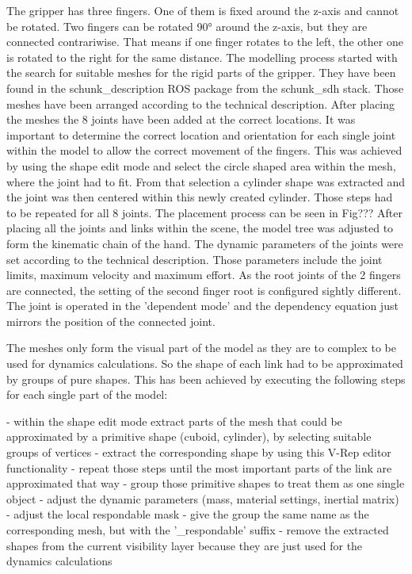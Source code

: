 The gripper has three fingers. One of them is fixed around the z-axis and cannot be rotated. Two fingers can be rotated 90° around the z-axis, but they are connected contrariwise. That means if one finger rotates to the left, the other one is rotated to the right for the same distance.
The modelling process started with the search for suitable meshes for the rigid parts of the gripper. They have been found in the schunk\_description ROS package from the schunk\_sdh stack. Those meshes have been arranged according to the technical description. After placing the meshes the 8 joints have been added at the correct locations. It was important to determine the correct location and orientation for each single joint within the model to allow the correct movement of the fingers. This was achieved by using the shape edit mode and select the circle shaped area within the mesh, where the joint had to fit. From that selection a cylinder shape was extracted and the joint was then centered within this newly created cylinder. Those steps had to be repeated for all 8 joints. The placement process can be seen in Fig??? After placing all the joints and links within the scene, the model tree was adjusted to form the kinematic chain of the hand. The dynamic parameters of the joints were set according to the technical description. Those parameters include the joint limits, maximum velocity and maximum effort. As the root joints of the 2 fingers are connected, the setting of the second finger root is configured sightly different. The joint is operated in the 'dependent mode' and the dependency equation just mirrors the position of the connected joint.

The meshes only form the visual part of the model as they are to complex to be used for dynamics calculations. So the shape of each link had to be approximated by groups of pure shapes. This has been achieved by executing the following steps for each single part of the model:

- within the shape edit mode extract parts of the mesh that could be approximated by a primitive
  shape (cuboid, cylinder), by selecting suitable groups of vertices
- extract the corresponding shape by using this V-Rep editor functionality
- repeat those steps until the most important parts of the link are approximated that way
- group those primitive shapes to treat them as one single object
- adjust the dynamic parameters (mass, material settings, inertial matrix)
- adjust the local respondable mask
- give the group the same name as the corresponding mesh, but with the '\_respondable' suffix
- remove the extracted shapes from the current visibility layer because they are just used for the
  dynamics calculations

